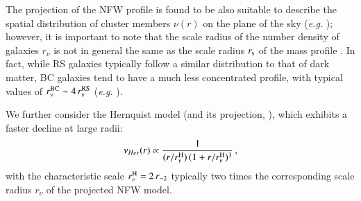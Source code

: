 \documentclass{aa}
\begin{document}
The projection of the NFW profile \citep{bartelmann1996} is found to be also suitable to describe the spatial distribution of cluster members $\nu(r)$ on the plane of the sky (\textit{e.g.} \citealt{Lin_2004, Annunziatella_2014, Sartoris_2020}); however, it is important to note that the scale radius of the number density of galaxies $r_\nu$ is not in general the same as the scale radius $r_{\rm s}$ of the mass profile \citep{Biviano_2006, Budzynski_2012}. In fact, while RS galaxies typically follow a similar distribution to that of dark matter, BC galaxies tend to have a much less concentrated profile, with typical values of $r_\nu^{\rm BC} \sim 4 \, r_\nu^{\rm RS}$ (\textit{e.g.} \citealt{Collister_2005}).

We further consider the Hernquist model (and its projection, \citealt{Hernquist_1990}), which exhibits a faster decline at large radii:
\begin{equation}
    \nu_{Her}(r) \propto \frac{1}{(r/r_{\nu}^{\rm H})\, (1+r/r_{\nu}^{\rm H})^3} \, ,
    \label{Hernquist}
\end{equation}
with the characteristic scale $r_\nu^{\rm H}=2\,r_{-2}$ typically two times the corresponding scale radius $r_\nu$ of the projected NFW model.


\end{document}
